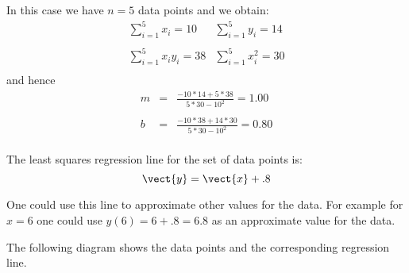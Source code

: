 \begin{solution}
In this case we have $n=5$ data points and we obtain:
\begin{equation*}
\begin{array}{ll}
\sum_{i=1}^{5}x_{i} = 10 & \sum_{i=1}^{5}y_{i} =  14 \\
\\
\sum_{i=1}^{5}x_{i}y_{i}  =  38 & \sum_{i=1}^{5}x_{i}^{2}  =   30\\
\end{array}
\end{equation*}
and hence
\begin{eqnarray*}
m &=& \frac{- 10 * 14 + 5*38}{5*30-10^2} = 1.00 \\
\\
b &=& \frac{- 10 * 38 + 14*30}{5*30-10^2} = 0.80 \\
\end{eqnarray*}

The  least squares regression line for the set of data points is:
\[ \vect{y} = \vect{x}+.8 \] 

One could use this line to approximate other values for the data. For
example for $x=6$ one could use $y(6)=6+.8=6.8$ as an approximate
value for the data.

The following diagram shows the data points and the corresponding regression line.

\begin{center}
\end{center}
\end{solution}

